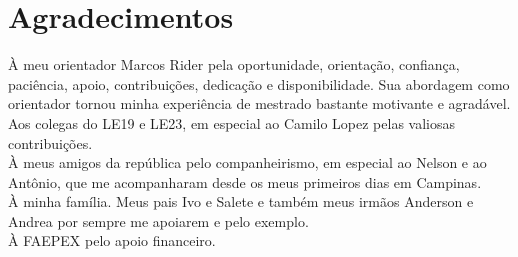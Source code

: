 \chapter*{Agradecimentos}%


À meu orientador Marcos Rider pela oportunidade, orientação, confiança, paciência, apoio, contribuições, dedicação e disponibilidade. Sua abordagem como orientador tornou minha experiência de mestrado bastante motivante e agradável. \\
Aos colegas do LE19 e LE23, em especial ao Camilo Lopez pelas valiosas contribuições.\\
À meus amigos da república pelo companheirismo, em especial ao Nelson e ao Antônio, que me acompanharam desde os meus primeiros dias em Campinas. \\
À minha família. Meus pais Ivo e Salete e também meus irmãos Anderson e Andrea por sempre me apoiarem e pelo exemplo.\\
À FAEPEX pelo apoio financeiro.



